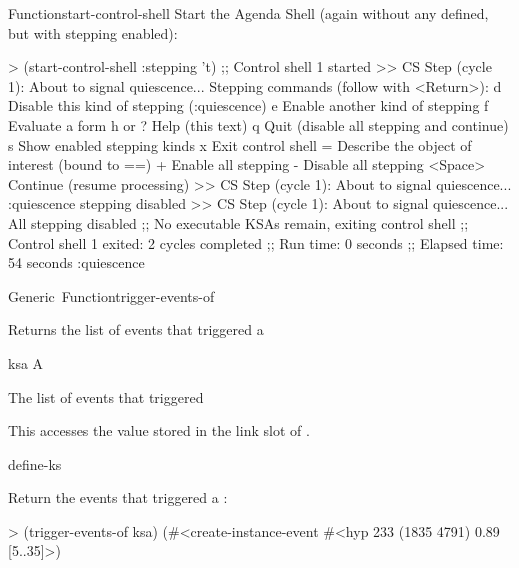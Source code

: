 \documentclass[10pt,twoside,english,pdftex]{article}
\begin{document}
\begin{functiondoc}{Function}{start-control-shell}
Start the Agenda Shell (again without any  defined, but with
stepping enabled):
%
\W\supp
\begin{example}
> (start-control-shell :stepping 't)
;; Control shell 1 started
>> CS Step (cycle 1):
   About to signal quiescence... 
Stepping commands (follow with <Return>):
   d       Disable this kind of stepping (:quiescence)
   e       Enable another kind of stepping
   f       Evaluate a form
   h or ?  Help (this text)
   q       Quit (disable all stepping and continue)
   s       Show enabled stepping kinds
   x       Exit control shell
   =       Describe the object of interest (bound to ==)
   +       Enable all stepping
   -       Disable all stepping
   <Space> Continue (resume processing)
>> CS Step (cycle 1):
   About to signal quiescence... 
:quiescence stepping disabled
>> CS Step (cycle 1):
   About to signal quiescence... 
All stepping disabled
;; No executable KSAs remain, exiting control shell
;; Control shell 1 exited: 2 cycles completed
;; Run time: 0 seconds
;; Elapsed time: 54 seconds
:quiescence
\end{example}

%
\fnnote \pollingnote

\end{functiondoc}


\begin{functiondoc}{Generic~Function}{trigger-events-of}{ 
    \returns{} }
%
%

\fnsyntax

\fnpurpose Returns the list of events that triggered a 

\fnmethods
{}

\fnpackage {}

\fnmodule {}

\fnargs
\begin{args}{ksa}
\arg[ksa] A 
\end{args}

\fnreturns The list of events that triggered 
  
\fndescription 
This  accesses the value stored in the
 link slot of .

\begin{alsos}{define-ks}
\also[define-ks]
\also[ks]
\also[ksa]
\end{alsos}

\fnexample
Return the events that triggered a :
%
\W\supp
\begin{example}
> (trigger-events-of ksa)
(#<create-instance-event #<hyp 233 (1835 4791) 0.89 [5..35]>)
\end{example}

\end{functiondoc}
\end{document}
